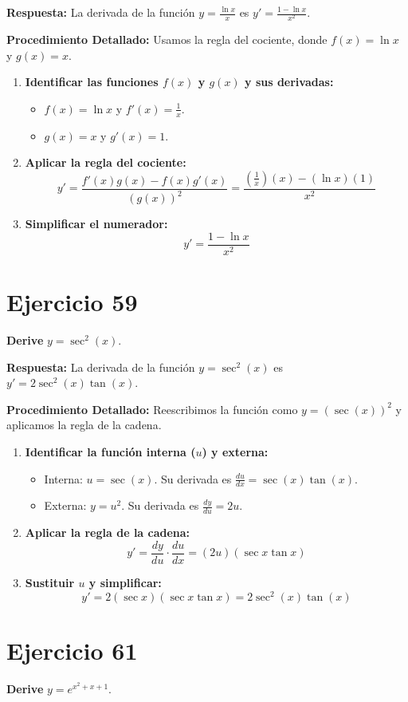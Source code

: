 \documentclass[12pt, a4paper]{article}
\begin{document}
\textbf{Respuesta:}
La derivada de la función $y=\frac{\ln x}{x}$ es $y'=\frac{1-\ln x}{x^2}$.

\textbf{Procedimiento Detallado:}
Usamos la regla del cociente, donde $f(x)=\ln x$ y $g(x)=x$.
\begin{enumerate}
    \item \textbf{Identificar las funciones $f(x)$ y $g(x)$ y sus derivadas:}
    \begin{itemize}
        \item $f(x)=\ln x$ y $f'(x)=\frac{1}{x}$.
        \item $g(x)=x$ y $g'(x)=1$.
    \end{itemize}
    \item \textbf{Aplicar la regla del cociente:}
    \[y'=\frac{f'(x)g(x)-f(x)g'(x)}{(g(x))^2}=\frac{(\frac{1}{x})(x)-(\ln x)(1)}{x^2}\]
    \item \textbf{Simplificar el numerador:}
    \[y'=\frac{1-\ln x}{x^2}\]
\end{enumerate}

\section{Ejercicio 59}
\textbf{Derive} $y=\sec^2(x)$.

\textbf{Respuesta:}
La derivada de la función $y=\sec^2(x)$ es $y'=2\sec^2(x)\tan(x)$.

\textbf{Procedimiento Detallado:}
Reescribimos la función como $y=(\sec(x))^2$ y aplicamos la regla de la cadena.
\begin{enumerate}
    \item \textbf{Identificar la función interna ($u$) y externa:}
    \begin{itemize}
        \item Interna: $u=\sec(x)$. Su derivada es $\frac{du}{dx}=\sec(x)\tan(x)$.
        \item Externa: $y=u^2$. Su derivada es $\frac{dy}{du}=2u$.
    \end{itemize}
    \item \textbf{Aplicar la regla de la cadena:}
    \[y'=\frac{dy}{du}\cdot\frac{du}{dx}=(2u)(\sec x\tan x)\]
    \item \textbf{Sustituir $u$ y simplificar:}
    \[y'=2(\sec x)(\sec x\tan x)=2\sec^2(x)\tan(x)\]
\end{enumerate}

\section{Ejercicio 61}
\textbf{Derive} $y=e^{x^2+x+1}$.
\end{document}
